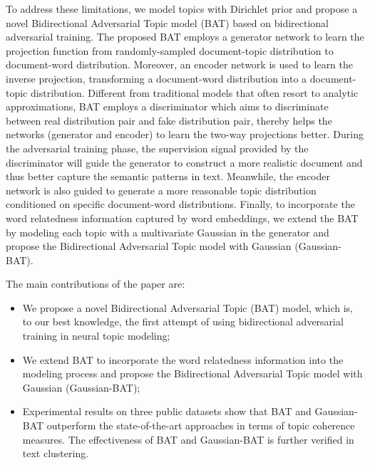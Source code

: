 \documentclass[11pt,a4paper]{article}
\begin{document}
{\color{black}To address these limitations, we model topics with Dirichlet prior and propose a novel Bidirectional Adversarial Topic model (BAT) based on bidirectional adversarial training. The proposed BAT employs a generator network to learn the projection function from randomly-sampled document-topic distribution to document-word distribution. Moreover, an encoder network is used to learn the inverse projection, transforming a document-word distribution into a document-topic distribution.  Different from traditional models that often resort to analytic approximations, BAT employs a discriminator which aims to discriminate between real distribution pair and fake distribution pair, thereby helps the networks (generator and encoder) to learn the two-way projections better.  During the adversarial training phase, the supervision signal provided by the discriminator will guide the generator to construct a more realistic document and thus better capture the semantic patterns in text. Meanwhile, the encoder network is also guided to generate a more reasonable topic distribution conditioned on specific document-word distributions. 
{\color{black}Finally, to incorporate the word relatedness information captured by word embeddings, we extend the BAT by modeling each topic with a multivariate Gaussian in the generator and propose the Bidirectional Adversarial Topic model with Gaussian (Gaussian-BAT). }}

The main contributions of the paper are:
\begin{itemize}
\item We propose a novel Bidirectional Adversarial Topic (BAT) model, which is, to our best knowledge, the first attempt of using bidirectional adversarial training in neural topic modeling;
\item We extend BAT to incorporate the word relatedness information into the modeling process and propose the Bidirectional Adversarial Topic model with Gaussian (Gaussian-BAT);
\item Experimental results on three public datasets show that BAT and Gaussian-BAT outperform the state-of-the-art approaches in terms of topic coherence measures. The effectiveness of BAT and Gaussian-BAT is further verified in text clustering.
\end{itemize}

\end{document}
